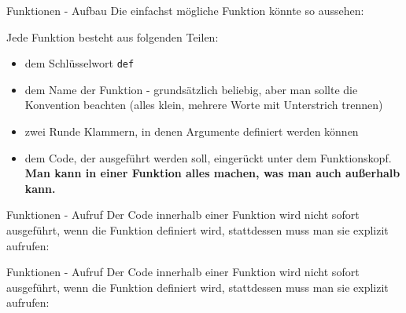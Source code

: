 \begin{frame}{Funktionen - Aufbau}
	Die einfachst mögliche Funktion könnte so aussehen:
	
	\pause
	Jede Funktion besteht aus folgenden Teilen:
	\pause
	\begin{itemize}
		\item dem Schlüsselwort \alert{\texttt{def}}
		\pause
		\item dem Name der Funktion - grundsätzlich beliebig, aber man sollte  die Konvention beachten (alles klein, mehrere Worte mit Unterstrich trennen)
		\pause
		\item zwei Runde Klammern, in denen Argumente definiert werden können
		\pause
		\item dem Code, der ausgeführt werden soll, eingerückt unter dem Funktionskopf. \textbf{Man kann in einer Funktion alles machen, was man auch außerhalb kann.}
	\end{itemize}
\end{frame}

\begin{frame}{Funktionen - Aufruf}
	Der Code innerhalb einer Funktion wird nicht sofort ausgeführt, wenn die Funktion definiert wird, stattdessen muss man sie explizit aufrufen:
	
\end{frame}

\begin{frame}{Funktionen - Aufruf}
	Der Code innerhalb einer Funktion wird nicht sofort ausgeführt, wenn die Funktion definiert wird, stattdessen muss man sie explizit aufrufen:
	
\end{frame}

